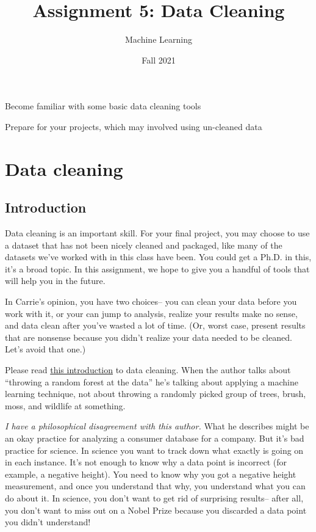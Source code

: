 \documentclass[Assignment5_Solutions]{subfiles}
\title{Assignment 5: Data Cleaning}
\author{Machine Learning}
\date{Fall 2021}
\begin{document}
\maketitle
\thispagestyle{firstpage}

\begin{learningobjectives}
\bi
\item Become familiar with some basic data cleaning tools
\item Prepare for your projects, which may involved using un-cleaned data
\ei
\end{learningobjectives}



\section{Data cleaning}
\subsection{Introduction}
Data cleaning is an important skill.  For your final project, you may choose to use a dataset that has not been nicely cleaned and packaged, like many of the datasets we've worked with in this class have been. You could get a Ph.D. in this, it's a broad topic. In this assignment, we hope to give you a handful of tools that will help you in the future.

In Carrie's opinion, you have two choices-- you can clean your data before you work with it, or your can jump to analysis, realize your results make no sense, and data clean after you've wasted a lot of time. (Or, worst case, present results that are nonsense because you didn't realize your data needed to be cleaned. Let's avoid that one.)

Please read \href{https://towardsdatascience.com/the-ultimate-guide-to-data-cleaning-3969843991d4}{this introduction} to data cleaning. When the author talks about ``throwing a random forest at the data'' he's talking about applying a machine learning technique, not about throwing a randomly picked group of trees, brush, moss, and wildlife at something.

\emph{I have a philosophical disagreement with this author.} What he describes might be an okay practice for analyzing a consumer database for a company.  But it's bad practice for science. In science you want to track down what exactly is going on in each instance. It's not enough to know why a data point is incorrect (for example, a negative height). You need to know why you got a negative height measurement, and once you understand that why, you understand what you can do about it. 
In science, you don't want to get rid of surprising results-- after all, you don't want to miss out on a Nobel Prize because you discarded a data point you didn't understand! 
\end{document}
